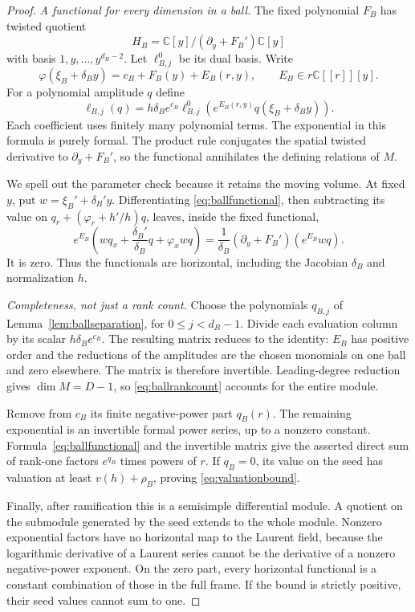 \documentclass[11pt]{article}
\theoremstyle{definition}\newtheorem{definition}[theorem]{Definition}
\theoremstyle{remark}\newtheorem{remark}[theorem]{Remark}
\newcommand{\C}{\mathbb C}
\begin{document}
\begin{proof}
\emph{A functional for every dimension in a ball.}
The fixed polynomial $F_B$ has twisted quotient
\[
 H_B=\C[y]/(\partial_y+F_B')\C[y]
\]
with basis $1,y,\ldots,y^{d_B-2}$. Let $\ell^0_{B,j}$ be its dual
basis. Write
\[
 \varphi(\xi_B+\delta_B y)=c_B+F_B(y)+E_B(r,y),
 \qquad E_B\in r\C[[r]][y].
\]
For a polynomial amplitude $q$ define
\begin{equation}\label{eq:ballfunctional}
 \ell_{B,j}(q)=h\delta_B e^{c_B}
   \ell^0_{B,j}\!\left(e^{E_B(r,y)}q(\xi_B+\delta_B y)\right).
\end{equation}
Each coefficient uses finitely many polynomial terms. The exponential
in this formula is purely formal. The product rule conjugates the
spatial twisted derivative to $\partial_y+F_B'$, so the functional
annihilates the defining relations of $M$.

We spell out the parameter check because it retains the moving volume.
At fixed $y$, put $w=\xi_B'+\delta_B'y$. Differentiating
\eqref{eq:ballfunctional}, then subtracting its value on
$q_r+(\varphi_r+h'/h)q$, leaves, inside the fixed functional,
\[
 e^{E_B}\left(wq_x+\frac{\delta_B'}{\delta_B}q+\varphi_xwq\right)
 =\frac1{\delta_B}(\partial_y+F_B')
                      \left(e^{E_B}wq\right).
\]
It is zero. Thus the functionals are horizontal, including the
Jacobian $\delta_B$ and normalization $h$.

\emph{Completeness, not just a rank count.}
Choose the polynomials $q_{B,j}$ of
Lemma~\ref{lem:ballseparation}, for $0\leq j<d_B-1$.
Divide each evaluation column by its scalar $h\delta_Be^{c_B}$.
The resulting matrix reduces to the identity: $E_B$ has positive
order and the reductions of the amplitudes are the chosen monomials
on one ball and zero elsewhere. The matrix is therefore invertible.
Leading-degree reduction gives $\dim M=D-1$, so
\eqref{eq:ballrankcount} accounts for the entire module.

Remove from $c_B$ its finite negative-power part $q_B(r)$.
The remaining exponential is an invertible formal power series,
up to a nonzero constant. Formula~\eqref{eq:ballfunctional} and the
invertible matrix give the asserted direct sum of rank-one factors
$e^{q_B}$ times powers of $r$. If $q_B=0$, its value on the seed
has valuation at least $v(h)+\rho_B$, proving
\eqref{eq:valuationbound}.

Finally, after ramification this is a semisimple differential module.
A quotient on the submodule generated by the seed extends to the
whole module. Nonzero exponential factors have no horizontal map
to the Laurent field, because the logarithmic derivative of a
Laurent series cannot be the derivative of a nonzero negative-power
exponent. On the zero part, every horizontal functional is a
constant combination of those in the full frame. If the bound is
strictly positive, their seed values cannot sum to one.
\end{proof}
\end{document}
